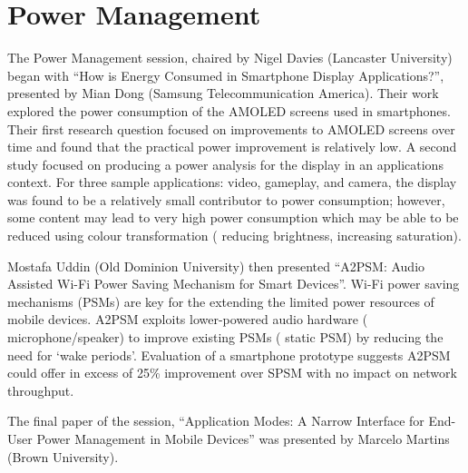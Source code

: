 \section{Power Management}
\label{sec:power}
The Power Management session, chaired by Nigel Davies (Lancaster University)
began with ``How is Energy Consumed in Smartphone Display Applications?'', 
presented by Mian Dong (Samsung Telecommunication America). Their work explored
the power consumption of the AMOLED screens used in smartphones. Their first 
research question focused on improvements to AMOLED screens over time
and found that the practical power improvement is relatively low.
A second study focused on 
producing a power analysis for the display in an applications context. For three 
sample applications: video, gameplay, and camera, the display was found to be a 
relatively small contributor to power consumption; however, some content may lead 
to very high power consumption which may be able to be reduced using colour 
transformation (\eg{} reducing brightness, increasing saturation).

Mostafa Uddin (Old Dominion University) then presented ``A2PSM: Audio Assisted 
Wi-Fi Power Saving Mechanism for Smart Devices''. Wi-Fi power saving mechanisms 
(PSMs) are key for the extending the limited power resources of mobile devices. 
A2PSM exploits lower-powered audio hardware (\eg{} microphone\slash speaker) to 
improve existing PSMs (\eg{} static PSM) by reducing the need for `wake periods'. 
Evaluation of a smartphone prototype suggests A2PSM could offer in excess of 25\%
improvement over SPSM with no impact on network throughput.

The final paper of the session, ``Application Modes: A Narrow Interface for End-
User Power Management in Mobile Devices'' was presented by Marcelo Martins (Brown 
University).